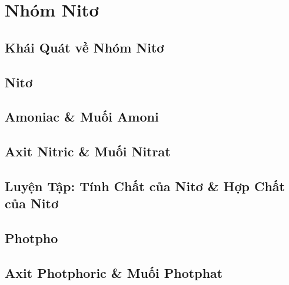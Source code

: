 \documentclass[oneside]{book}
\numberwithin{equation}{section}
\begin{document}
\chapter{Nhóm Nitơ}

\section{Khái Quát về Nhóm Nitơ}


\section{Nitơ}


\section{Amoniac \& Muối Amoni}


\section{Axit Nitric \& Muối Nitrat}


\section{Luyện Tập: Tính Chất của Nitơ \& Hợp Chất của Nitơ}


\section{Photpho}


\section{Axit Photphoric \& Muối Photphat}

\end{document}
